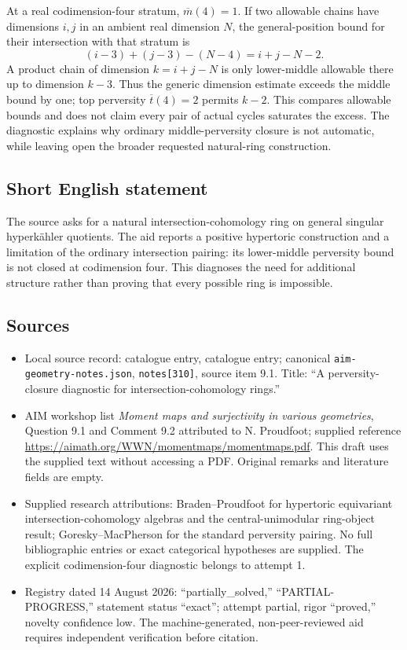 \documentclass[11pt]{article}
\begin{document}
At a real codimension-four stratum, \(\overline m(4)=1\). If two allowable chains have dimensions \(i,j\) in an ambient real dimension \(N\), the general-position bound for their intersection with that stratum is
\[
 (i-3)+(j-3)-(N-4)=i+j-N-2.
\]
A product chain of dimension \(k=i+j-N\) is only lower-middle allowable there up to dimension \(k-3\). Thus the generic dimension estimate exceeds the middle bound by one; top perversity \(\overline t(4)=2\) permits \(k-2\). This compares allowable bounds and does not claim every pair of actual cycles saturates the excess. The diagnostic explains why ordinary middle-perversity closure is not automatic, while leaving open the broader requested natural-ring construction.
\subsection{Short English statement}
The source asks for a natural intersection-cohomology ring on general singular hyperk\"ahler quotients. The aid reports a positive hypertoric construction and a limitation of the ordinary intersection pairing: its lower-middle perversity bound is not closed at codimension four. This diagnoses the need for additional structure rather than proving that every possible ring is impossible.
\subsection{Sources}
\begin{itemize}
\item Local source record: catalogue entry, catalogue entry; canonical \texttt{aim-geometry-notes.json}, \texttt{notes[310]}, source item 9.1. Title: ``A perversity-closure diagnostic for intersection-cohomology rings.''
\item AIM workshop list \emph{Moment maps and surjectivity in various geometries}, Question 9.1 and Comment 9.2 attributed to N. Proudfoot; supplied reference \url{https://aimath.org/WWN/momentmaps/momentmaps.pdf}. This draft uses the supplied text without accessing a PDF. Original remarks and literature fields are empty.
\item Supplied research attributions: Braden--Proudfoot for hypertoric equivariant intersection-cohomology algebras and the central-unimodular ring-object result; Goresky--MacPherson for the standard perversity pairing. No full bibliographic entries or exact categorical hypotheses are supplied. The explicit codimension-four diagnostic belongs to attempt 1.
\item Registry dated 14 August 2026: ``partially\_solved,'' ``PARTIAL-PROGRESS,'' statement status ``exact''; attempt partial, rigor ``proved,'' novelty confidence low. The machine-generated, non-peer-reviewed aid requires independent verification before citation.
\end{itemize}
\end{document}
